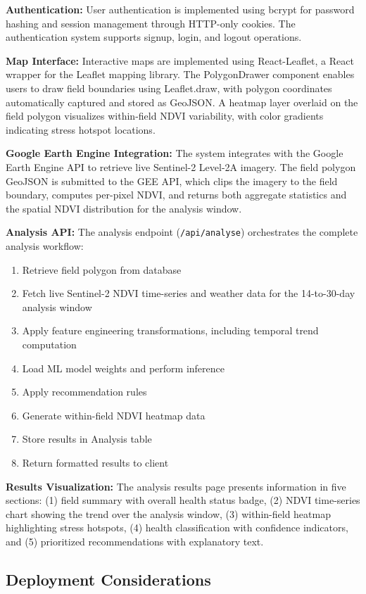 \documentclass[journal]{IEEEtran}
\begin{document}
\textbf{Authentication:} User authentication is implemented using bcrypt for password hashing and session management through HTTP-only cookies. The authentication system supports signup, login, and logout operations.

\textbf{Map Interface:} Interactive maps are implemented using React-Leaflet, a React wrapper for the Leaflet mapping library. The PolygonDrawer component enables users to draw field boundaries using Leaflet.draw, with polygon coordinates automatically captured and stored as GeoJSON. A heatmap layer overlaid on the field polygon visualizes within-field NDVI variability, with color gradients indicating stress hotspot locations.

\textbf{Google Earth Engine Integration:} The system integrates with the Google Earth Engine API to retrieve live Sentinel-2 Level-2A imagery. The field polygon GeoJSON is submitted to the GEE API, which clips the imagery to the field boundary, computes per-pixel NDVI, and returns both aggregate statistics and the spatial NDVI distribution for the analysis window.

\textbf{Analysis API:} The analysis endpoint (\texttt{/api/analyse}) orchestrates the complete analysis workflow:
\begin{enumerate}
\item Retrieve field polygon from database
\item Fetch live Sentinel-2 NDVI time-series and weather data for the 14-to-30-day analysis window
\item Apply feature engineering transformations, including temporal trend computation
\item Load ML model weights and perform inference
\item Apply recommendation rules
\item Generate within-field NDVI heatmap data
\item Store results in Analysis table
\item Return formatted results to client
\end{enumerate}

\textbf{Results Visualization:} The analysis results page presents information in five sections: (1) field summary with overall health status badge, (2) NDVI time-series chart showing the trend over the analysis window, (3) within-field heatmap highlighting stress hotspots, (4) health classification with confidence indicators, and (5) prioritized recommendations with explanatory text.

\subsection{Deployment Considerations}
\end{document}
